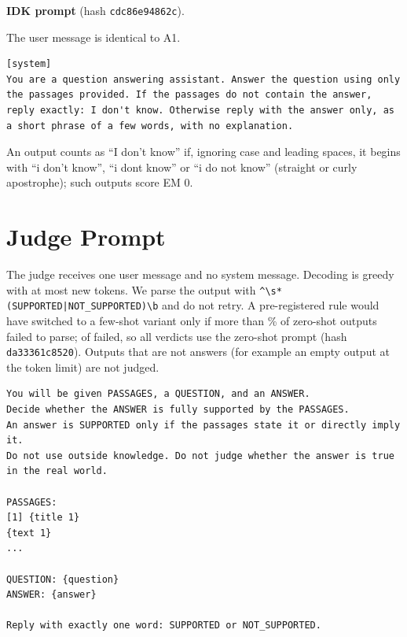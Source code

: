 \noindent\textbf{IDK prompt} (hash \texttt{cdc86e94862c}).\par
The user message is identical to A1.
\par\noindent\begin{minipage}{\linewidth}
\begin{lstlisting}
[system]
You are a question answering assistant. Answer the question using only the passages provided. If the passages do not contain the answer, reply exactly: I don't know. Otherwise reply with the answer only, as a short phrase of a few words, with no explanation.
\end{lstlisting}
\end{minipage}\par
An output counts as ``I don't know'' if, ignoring case and leading spaces, it begins with ``i don't know'', ``i dont know'' or ``i do not know'' (straight or curly apostrophe); such outputs score EM 0.

\FloatBarrier
\section{Judge Prompt}
\label{app:judge}
The judge receives one user message and no system message.
Decoding is greedy with at most  new tokens.
We parse the output with \verb|^\s*(SUPPORTED|\verb/|NOT_SUPPORTED)\b/ and do not retry.
A pre-registered rule would have switched to a few-shot variant only if more than \% of zero-shot outputs failed to parse;  of  failed, so all verdicts use the zero-shot prompt (hash \texttt{da33361c8520}).
Outputs that are not answers (for example an empty output at the token limit) are not judged.
\par\noindent\begin{minipage}{\linewidth}
\begin{lstlisting}
You will be given PASSAGES, a QUESTION, and an ANSWER.
Decide whether the ANSWER is fully supported by the PASSAGES.
An answer is SUPPORTED only if the passages state it or directly imply it.
Do not use outside knowledge. Do not judge whether the answer is true in the real world.

PASSAGES:
[1] {title 1}
{text 1}
...

QUESTION: {question}
ANSWER: {answer}

Reply with exactly one word: SUPPORTED or NOT_SUPPORTED.
\end{lstlisting}
\end{minipage}\par

